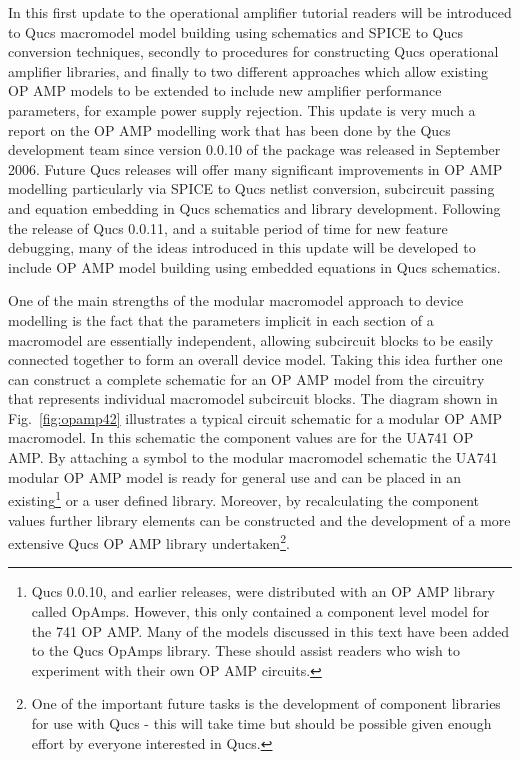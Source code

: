 In this first update to the operational amplifier tutorial readers will be introduced to Qucs macromodel model building using schematics and SPICE to Qucs conversion techniques, secondly to procedures for constructing  Qucs operational amplifier libraries, and finally to two different approaches which allow existing OP AMP models to be extended to include new amplifier performance parameters, for example power supply rejection. This update is very much a report on the OP AMP modelling work that has been done by the Qucs development team since version 0.0.10 of the package was released in September 2006.  Future Qucs releases will offer many significant improvements in OP AMP modelling particularly via SPICE to Qucs netlist conversion, subcircuit passing and equation embedding in Qucs schematics  and library development. Following the release of Qucs 0.0.11, and a suitable period of time for new feature debugging, many of the ideas introduced in this update will be developed to include OP AMP model building using embedded equations in Qucs schematics.

One of the main strengths of the modular macromodel approach to device modelling is the fact that the parameters implicit in each section of a macromodel are essentially independent, allowing subcircuit blocks to be easily connected together to form an overall device model.  Taking this idea further one can construct a complete schematic for an OP AMP model from the circuitry that represents individual macromodel subcircuit blocks.  The diagram shown in Fig.~\ref{fig:opamp42} illustrates a typical circuit schematic for a modular OP AMP macromodel.  In this schematic the component values are for the UA741 OP AMP.  By attaching a symbol to the modular macromodel schematic the UA741 modular OP AMP model is ready for general use and can be placed in an existing\footnote{Qucs 0.0.10, and earlier releases, were distributed with an OP AMP library called OpAmps. However, this only contained a component level model for the 741 OP AMP. Many of the models discussed in this text have been added to the Qucs OpAmps library. These should assist readers who wish to experiment with their own OP AMP circuits.} or a user defined library.  Moreover, by recalculating the component values further library elements can be constructed and the development of a more extensive Qucs OP AMP library undertaken\footnote{One of the important future tasks is the development of component libraries for use with Qucs - this will take time but should be possible given enough effort by everyone interested in Qucs.}.
 
